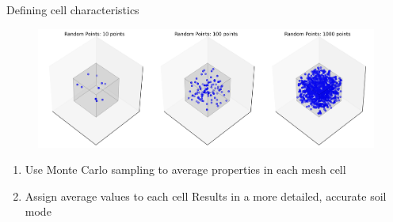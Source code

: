 \documentclass[10pt,hyperref={colorlinks,citecolor=blue,urlcolor=peking_blue,linkcolor=}]{beamer}
\theoremstyle{plain}
\begin{document}
\begin{frame}{Defining cell characteristics}
\begin{figure}[Individual Cell Sampling]
\begin{center}
\includegraphics[width=1\linewidth]{../Figures/FunctionallyDefinedSoil/IndividualCellSampling.png}
\end{center}
\end{figure}
\begin{enumerate}
\item Use Monte Carlo sampling to average properties in each mesh cell
\item Assign average values to each cell
Results in a more detailed, accurate soil mode
\end{enumerate}
\end{frame}
\end{document}
